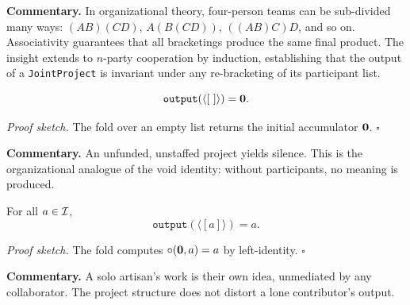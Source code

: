 \medskip

\noindent\textbf{Commentary.}
In organizational theory, four-person teams can be sub-divided many ways:
$(AB)(CD)$, $A(B(CD))$, $((AB)C)D$, and so on.  Associativity guarantees
that all bracketings produce the same final product.  The insight extends to
$n$-party cooperation by induction, establishing that the output of a
\texttt{JointProject} is invariant under any re-bracketing of its participant
list.

\begin{theorem}
\label{thm:empty_project_void}
\[
  \texttt{output}(\langle [\ ] \rangle) = \mathbf{0}.
\]
\end{theorem}

\noindent\textit{Proof sketch.}\quad
The fold over an empty list returns the initial accumulator $\mathbf{0}$.
\hfill$\square$

\medskip

\noindent\textbf{Commentary.}
An unfunded, unstaffed project yields silence.  This is the organizational
analogue of the void identity: without participants, no meaning is produced.

\begin{theorem}
\label{thm:singleton_project}
For all $a \in \mathcal{I}$,
\[
  \texttt{output}(\langle [a] \rangle) = a.
\]
\end{theorem}

\noindent\textit{Proof sketch.}\quad
The fold computes $\circ(\mathbf{0}, a) = a$ by left-identity.
\hfill$\square$

\medskip

\noindent\textbf{Commentary.}
A solo artisan's work is their own idea, unmediated by any collaborator.
The project structure does not distort a lone contributor's output.

